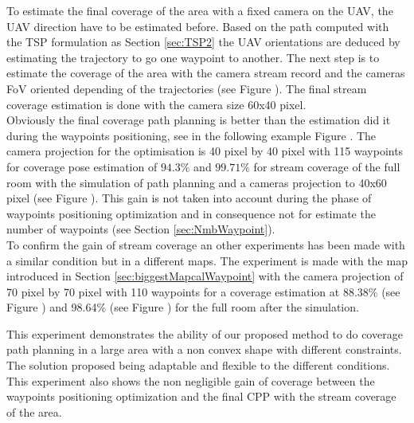 To estimate the final coverage of the area with a fixed camera on the UAV, the UAV direction have to be estimated before. 
Based on the path computed with the TSP formulation as Section \ref{sec:TSP2} the UAV orientations are deduced by estimating the trajectory to go one waypoint to another.
The next step is to estimate the coverage of the area with the camera stream  record and the cameras FoV oriented depending of the trajectories (see Figure ). The final stream coverage estimation is done with the camera size 60x40 pixel. \\
Obviously the final coverage path planning is better than the estimation did it during the waypoints positioning, see  in the following example Figure . The camera projection for the optimisation  is 40 pixel by 40 pixel with 115 waypoints for coverage pose estimation of $94.3\%$ and $99.71\%$ for stream coverage of the full room with the simulation of path planning and a cameras projection to 40x60 pixel (see Figure ). This gain is not taken into account during the phase of waypoints positioning optimization and in consequence not for estimate the number of waypoints (see Section \ref{sec:NmbWaypoint}).\\
To confirm the gain of stream coverage an other experiments has been made with a similar condition but in a different maps. The experiment is made with the map introduced in Section \ref{sec:biggestMapcalWaypoint} with the camera projection of 70 pixel by 70 pixel with 110 waypoints for a coverage estimation at 88.38\%  (see Figure ) and 98.64\% (see Figure ) for the full room after the simulation.

This experiment demonstrates the ability of our proposed method to do coverage path planning in a large area with a non convex shape with different constraints. The solution proposed being adaptable and flexible to the different conditions. This experiment also shows the non negligible gain of coverage between the waypoints positioning optimization and the final CPP with the stream coverage of the area.




